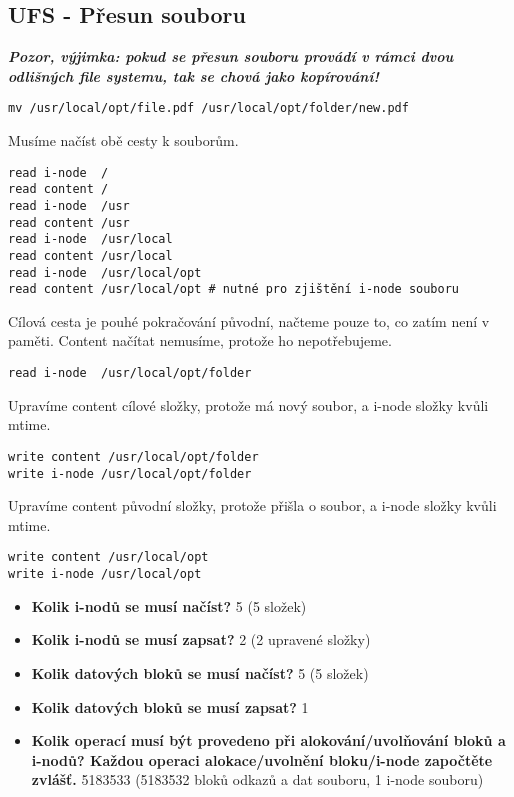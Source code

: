 \subsection{UFS - Přesun souboru}

\textit{\textbf{Pozor, výjimka: pokud se přesun souboru provádí v rámci dvou odlišných file systemu, tak se chová jako kopírování!}}

\begin{verbatim}
mv /usr/local/opt/file.pdf /usr/local/opt/folder/new.pdf
\end{verbatim}

Musíme načíst obě cesty k souborům.
\begin{verbatim}
read i-node  /
read content /
read i-node  /usr
read content /usr
read i-node  /usr/local
read content /usr/local
read i-node  /usr/local/opt
read content /usr/local/opt # nutné pro zjištění i-node souboru
\end{verbatim}

Cílová cesta je pouhé pokračování původní, načteme pouze to, co zatím není v paměti. Content načítat nemusíme, protože ho nepotřebujeme.
\begin{verbatim}
read i-node  /usr/local/opt/folder
\end{verbatim}

Upravíme content cílové složky, protože má nový soubor, a i-node složky kvůli mtime.
\begin{verbatim}
write content /usr/local/opt/folder
write i-node /usr/local/opt/folder
\end{verbatim}

Upravíme content původní složky, protože přišla o soubor, a i-node složky kvůli mtime.
\begin{verbatim}
write content /usr/local/opt
write i-node /usr/local/opt
\end{verbatim}

\begin{itemize}
    \item \textbf{Kolik i-nodů se musí načíst?} 5 
    (5 složek)
    \item \textbf{Kolik i-nodů se musí zapsat?} 2
    (2 upravené složky)
    \item \textbf{Kolik datových bloků se musí načíst?} 5 
    (5 složek)
    \item \textbf{Kolik datových bloků se musí zapsat?} 1
    \item \textbf{Kolik operací musí být provedeno při alokování/uvolňování bloků a i-nodů? Každou operaci alokace/uvolnění bloku/i-node započtěte zvlášť.} 5183533
    (5183532 bloků odkazů a dat souboru, 1 i-node souboru)
\end{itemize}
